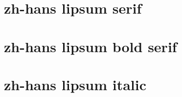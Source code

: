 \documentclass[a4paper,12pt, fontset=none, hyperref]{ctexbook}
\begin{document}
		\textit{\zhlipsum[1-20][name=nanshanjing]}

	\chapter{zh-hans lipsum serif}

		\zhlipsum[1-20]
		
	\chapter{zh-hans lipsum bold serif}

		\textbf{\zhlipsum[1-20]}

	\chapter{zh-hans lipsum italic}

		\textit{\zhlipsum[1-20]}
\end{document}
